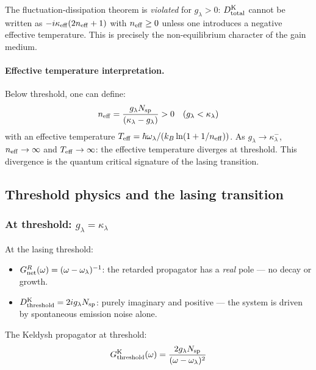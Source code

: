 \documentclass[12pt]{article}
\newcommand{\Keldysh}{{\rm K}}
\begin{document}
The fluctuation-dissipation theorem is \emph{violated} for $g_\lambda > 0$:
$D^\Keldysh_{\rm total}$ cannot be written as $-i\kappa_{\rm eff}
(2n_{\rm eff}+1)$ with $n_{\rm eff}\geq 0$ unless one introduces a
negative effective temperature.  This is precisely the non-equilibrium
character of the gain medium.

\paragraph{Effective temperature interpretation.}
Below threshold, one can define:
\begin{equation}
  n_{\rm eff} = \frac{g_\lambda N_{\rm sp}}{(\kappa_\lambda - g_\lambda)} > 0
  \quad (g_\lambda < \kappa_\lambda)
  \label{eq:n_eff}
\end{equation}
with an effective temperature $T_{\rm eff} = \hbar\omega_\lambda/
(k_B\ln(1+1/n_{\rm eff}))$.  As $g_\lambda\to\kappa_\lambda^-$,
$n_{\rm eff}\to\infty$ and $T_{\rm eff}\to\infty$: the effective
temperature diverges at threshold.  This divergence is the quantum
critical signature of the lasing transition.

\subsection{Threshold physics and the lasing transition}
\label{sec:threshold}

\subsubsection*{At threshold: $g_\lambda = \kappa_\lambda$}

At the lasing threshold:
\begin{itemize}
  \item $G^R_{\rm net}(\omega) = (\omega - \omega_\lambda)^{-1}$:
    the retarded propagator has a \emph{real} pole --- no decay or growth.
  \item $D^\Keldysh_{\rm threshold} = 2ig_\lambda N_{\rm sp}$:
    purely imaginary and positive --- the system is driven by spontaneous
    emission noise alone.
\end{itemize}

The Keldysh propagator at threshold:
\begin{equation}
  G^\Keldysh_{\rm threshold}(\omega) =
  \frac{2g_\lambda N_{\rm sp}}{(\omega-\omega_\lambda)^2}
  \label{eq:GK_threshold}
\end{equation}
\end{document}
